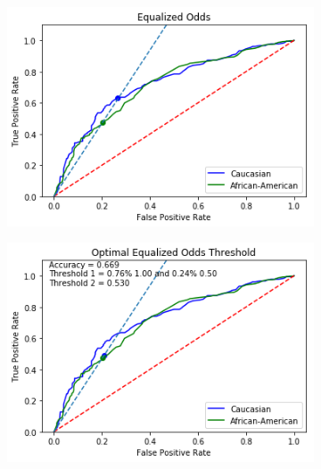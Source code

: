\documentclass[11pt, fleqn, titlepage]{article}
\begin{document}
	\begin{figure}[H]
		\centering
		\begin{subfigure}{0.5\textwidth}
			\centering
			\includegraphics[width=0.9\linewidth]{"imgs/Equalized Odds Optimal"}
		\end{subfigure}%
		\begin{subfigure}{0.5\textwidth}
			\centering
			\includegraphics[width=0.9\linewidth]{"imgs/Equalized Odds Correctied"}
		\end{subfigure}

\end{figure}
\end{document}
